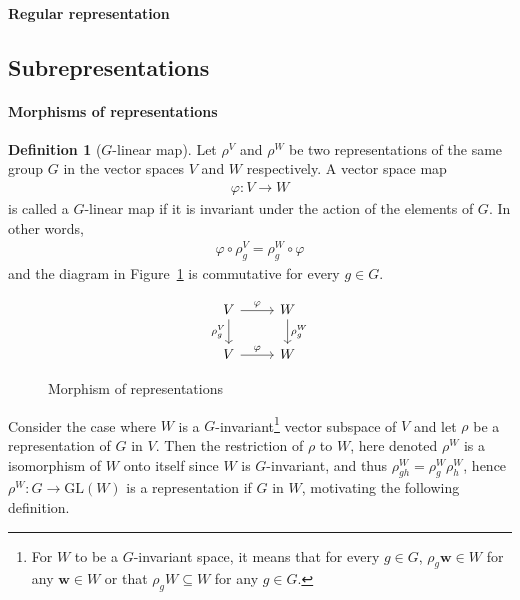 \documentclass[12pt, a4paper, twoside]{article}
\theoremstyle{definition}
\newtheorem{definition}{Definition}[section]
\theoremstyle{remark}
\numberwithin{equation}{section}
\newcommand{\1}{\mathbf{1}}
\newcommand{\0}{\mathbf{0}}
\newcommand{\GL}{\text{GL}}
\newcommand{\wvec}{\mathbf{w}}
\begin{document}
\paragraph{Regular representation}


\subsection{Subrepresentations}
	
\paragraph{Morphisms of representations}

	\begin{definition}[$G$-linear map]\cite{FultonHarris}
		Let $\rho^V$ and $\rho^W$ be two representations of the same group $G$ in the vector spaces $V$ and $W$ respectively. A vector space map
		\begin{align*}
			\varphi: V \rightarrow W
		\end{align*} 
		is called a $G$-linear map if it is invariant under the action of the elements of $G$. In other words, 
		\begin{align*}
			\varphi \circ \rho^V_g = \rho^W_g \circ \varphi
		\end{align*}
		and	the diagram in Figure~\ref*{fig:commapmorp} is commutative for every $g \in G$.
		\begin{figure}[hbt!]
			\centering
			\[\begin{tikzcd}
				V \arrow{r}{\varphi} \arrow[swap]{d}{\rho^V_g} & W \arrow{d}{\rho^W_g} \\
				V \arrow{r}{\varphi} & W
			\end{tikzcd}\]
			\caption{Morphism of representations}
			\label{fig:commapmorp}
		\end{figure}
	\end{definition}
	
	Consider the case where $W$ is a $G$-invariant\footnote{For $W$ to be a $G$-invariant space, it means that for every $g \in G$, $\rho_g\wvec \in W$ for any $\wvec \in W$ or that $\rho_g W \subseteq W$ for any $g\in G$.} vector subspace of $V$%
	and let $\rho$ be a representation of $G$ in $V$. Then the restriction of $\rho$ to $W$, here denoted $\rho^W$ is a isomorphism of $W$ onto itself since $W$ is $G$-invariant, and thus $\rho^W_{gh} = \rho_g^W \rho^W_h$, hence $\rho^W: G \rightarrow \GL(W)$ is a representation if $G$ in $W$, motivating the following definition.
	
\end{document}
